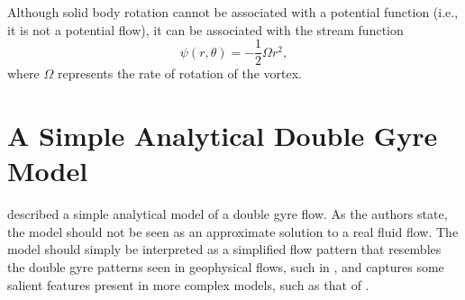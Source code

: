 \documentclass[10pt, twoside]{book}
\begin{document}
			Although solid body rotation cannot be associated with a potential function (i.e., it is not a potential flow), it can be associated with the stream function
			\begin{equation}
			\label{eq:RotVortexStreamPol}
				\psi\left(r,\theta\right) = -\frac{1}{2}\Omega r^2,
			\end{equation}
			where $\Omega$ represents the rate of rotation of the vortex.
			
		\section{\label{sec:DoubleGyre}A Simple Analytical Double Gyre Model}
			
			\citet{Shadden05} described a simple analytical model of a double gyre flow. As the authors state, the model should not be seen as an approximate solution to a real fluid flow. The model should simply be interpreted as a simplified flow pattern that resembles the double gyre patterns seen in geophysical flows, such in \citet{Coulliette07}, and captures some salient features present in more complex models, such as that of \citet{Coulliette00,Coulliette01}.
			
\end{document}
